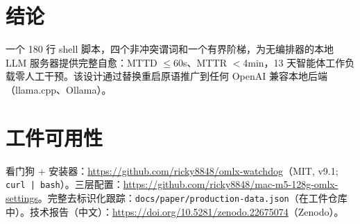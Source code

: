 \documentclass[10pt]{article}
\begin{document}
\section{结论}

一个 180 行 shell 脚本，四个非冲突谓词和一个有界阶梯，为无编排器的本地 LLM 服务器提供完整自愈：MTTD $\le 60$s、MTTR $<$4min，13 天智能体工作负载零人工干预。该设计通过替换重启原语推广到任何 OpenAI 兼容本地后端（llama.cpp、Ollama）。

\section*{工件可用性}

看门狗 + 安装器：\url{https://github.com/ricky8848/omlx-watchdog}（MIT, v9.1; \texttt{curl | bash}）。三层配置：\url{https://github.com/ricky8848/mac-m5-128g-omlx-settings}。完整去标识化跟踪：\texttt{docs/paper/production-data.json}（在工件仓库中）。技术报告（中文）：\url{https://doi.org/10.5281/zenodo.22675074}（Zenodo）。
\end{document}
